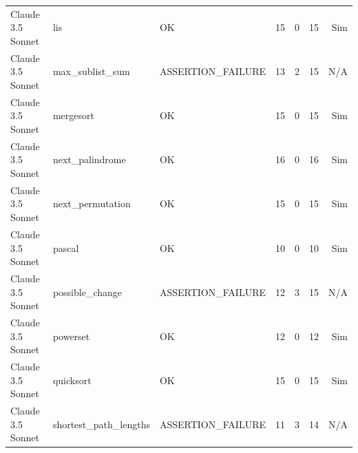 \begin{longtable}{lllrrrr}
Claude 3.5 Sonnet & lis & OK & 15 & 0 & 15 & Sim \\
Claude 3.5 Sonnet & max\_sublist\_sum & ASSERTION\_FAILURE & 13 & 2 & 15 & N/A \\
Claude 3.5 Sonnet & mergesort & OK & 15 & 0 & 15 & Sim \\
Claude 3.5 Sonnet & next\_palindrome & OK & 16 & 0 & 16 & Sim \\
Claude 3.5 Sonnet & next\_permutation & OK & 15 & 0 & 15 & Sim \\
Claude 3.5 Sonnet & pascal & OK & 10 & 0 & 10 & Sim \\
Claude 3.5 Sonnet & possible\_change & ASSERTION\_FAILURE & 12 & 3 & 15 & N/A \\
Claude 3.5 Sonnet & powerset & OK & 12 & 0 & 12 & Sim \\
Claude 3.5 Sonnet & quicksort & OK & 15 & 0 & 15 & Sim \\
Claude 3.5 Sonnet & shortest\_path\_lengths & ASSERTION\_FAILURE & 11 & 3 & 14 & N/A \\
\bottomrule
\end{longtable}
